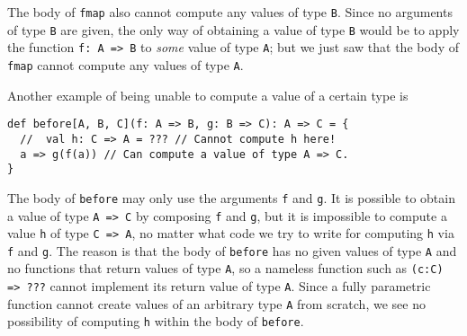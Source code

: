 The body of \lstinline!fmap!
also cannot compute any values of type \lstinline!B!.
Since no arguments of type \lstinline!B!
are given, the only way of obtaining a value of type \lstinline!B!
would be to apply the function \lstinline!f: A => B!
to \emph{some} value of type \lstinline!A!;
but we just saw that the body of \lstinline!fmap!
cannot compute any values of type \lstinline!A!.

Another example of being unable to compute a value of a certain type
is
\begin{lstlisting}
def before[A, B, C](f: A => B, g: B => C): A => C = {
  //  val h: C => A = ??? // Cannot compute h here!
  a => g(f(a)) // Can compute a value of type A => C.
}
\end{lstlisting}
The body of \lstinline!before!
may only use the arguments \lstinline!f!
and \lstinline!g!. It is
possible to obtain a value of type \lstinline!A => C!
by composing \lstinline!f!
and \lstinline!g!, but
it is impossible to compute a value \lstinline!h!
of type \lstinline!C => A!,
no matter what code we try to write for computing \lstinline!h!
via \lstinline!f! and \lstinline!g!.
The reason is that the body of \lstinline!before!
has no given values of type \lstinline!A!
and no functions that return values of type \lstinline!A!,
so a nameless function such as \lstinline!(c:C) => ???!
cannot implement its return value of type \lstinline!A!.
Since a fully parametric function cannot create values of an arbitrary
type \lstinline!A! from
scratch, we see no possibility of computing \lstinline!h!
within the body of \lstinline!before!.


